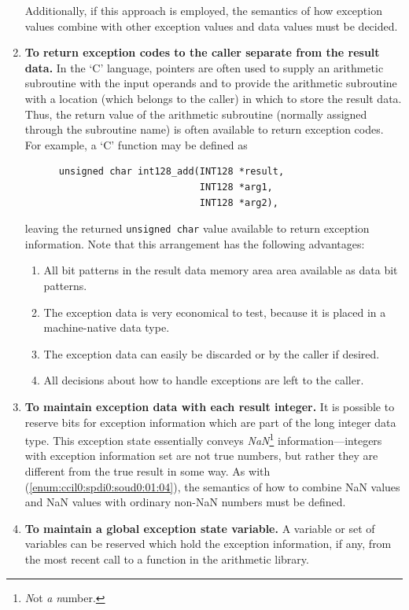 \begin{enumerate}
      Additionally, if this approach is employed, the semantics of how exception
      values combine with other exception values and data values must be decided.
\item \label{enum:ccil0:spdi0:soud0:01:05}
      \textbf{To return exception codes to the caller separate from the result data.}
      In the `C' language, pointers are often used to supply an arithmetic subroutine
      with the input operands and to provide the arithmetic subroutine with a location
      (which belongs to the caller) in which to store the result data.  Thus, the return
      value of the arithmetic subroutine (normally assigned through the subroutine name)
      is often available to return exception codes.  For example,
      a `C' function may be defined as 

      \begin{verbatim}
      unsigned char int128_add(INT128 *result, 
                               INT128 *arg1, 
                               INT128 *arg2),
      \end{verbatim}

      leaving the returned \texttt{unsigned char} value available to return
      exception information.  Note that this arrangement has the following advantages:

      \begin{enumerate}
      \item All bit patterns in the result data memory area area available
            as data bit patterns.
      \item The exception data is very economical to test, because it is placed
            in a machine-native data type.
      \item The exception data can easily be discarded or by the caller if desired.
      \item All decisions about how to handle exceptions are left to the caller. 
      \end{enumerate}
\item \label{enum:ccil0:spdi0:soud0:01:06}
      \textbf{To maintain exception data with each result integer.}
      It is possible to reserve bits for exception information which are part of the
      long integer data type.  This exception state essentially conveys 
      \emph{NaN}\footnote{\emph{N}ot \emph{a} \emph{n}umber.} information---integers with
      exception information set are not true numbers, but rather they are different from the
      true result in some way.  As with (\ref{enum:ccil0:spdi0:soud0:01:04}), the 
      semantics of how to combine NaN values and NaN values with ordinary non-NaN numbers
      must be defined.
\item \label{enum:ccil0:spdi0:soud0:01:07}
      \textbf{To maintain a global exception state variable.}
      A variable or set of variables can be reserved which hold the
      exception information, if any, from the most recent call to 
      a function in the arithmetic library.
      

\end{enumerate}
